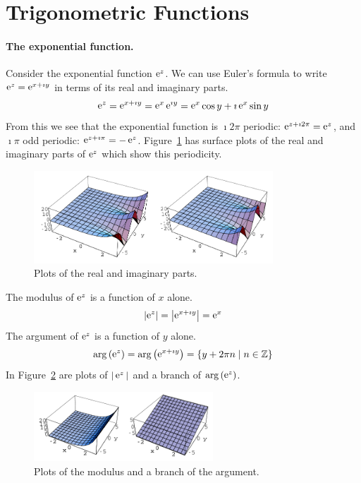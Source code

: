 \section{Trigonometric Functions}




\paragraph{The exponential function.}
Consider the exponential function $\mathop{\mathrm{e}}\nolimits^z$.  
We can use Euler's formula to write $\mathop{\mathrm{e}}\nolimits^z = \mathop{\mathrm{e}}\nolimits^{x + \imath y}$ in terms of its 
real and imaginary parts. 
\[
\mathop{\mathrm{e}}\nolimits^z = \mathop{\mathrm{e}}\nolimits^{x + \imath y} = \mathop{\mathrm{e}}\nolimits^x \mathop{\mathrm{e}}\nolimits^{\imath y} = \mathop{\mathrm{e}}\nolimits^x \cos y + \imath \mathop{\mathrm{e}}\nolimits^x \sin y
\]
From this we see that the exponential function is $\imath 2 \pi$ periodic:  
$\mathop{\mathrm{e}}\nolimits^{z + \imath 2 \pi} = \mathop{\mathrm{e}}\nolimits^z$, and $\imath \pi$ odd periodic: $\mathop{\mathrm{e}}\nolimits^{z + \imath \pi} = -\mathop{\mathrm{e}}\nolimits^z$.
Figure~\ref{expreim} has surface plots of the real and imaginary parts
of $\mathop{\mathrm{e}}\nolimits^z$ which show this periodicity.
\begin{figure}[htbp!]
  \begin{center}
    \includegraphics[width=0.8\textwidth]{fcv/function/expreim}
  \end{center}
  \caption{Plots of the real and imaginary parts.}
  \label{expreim}
\end{figure}

The modulus of $\mathop{\mathrm{e}}\nolimits^z$ is a function of $x$ alone.
\[
\left| \mathop{\mathrm{e}}\nolimits^z \right| = \left| \mathop{\mathrm{e}}\nolimits^{x + \imath y} \right| = \mathop{\mathrm{e}}\nolimits^x
\]
The argument of $\mathop{\mathrm{e}}\nolimits^z$ is a function of $y$ alone.
\[
\arg \left( \mathop{\mathrm{e}}\nolimits^z \right) = \arg \left( \mathop{\mathrm{e}}\nolimits^{x + \imath y} \right) = 
\{ y + 2 \pi n \mid n \in \mathbb{Z} \} 
\]
In Figure~\ref{expma} are plots of $|\mathop{\mathrm{e}}\nolimits^z|$ and a branch of 
$\arg \left( \mathop{\mathrm{e}}\nolimits^z \right)$.
\begin{figure}[htbp!]
  \begin{center}
    \includegraphics[width=0.6\textwidth]{fcv/function/expma}
  \end{center}
  \caption{Plots of the modulus and a branch of the argument.}
  \label{expma}
\end{figure}







